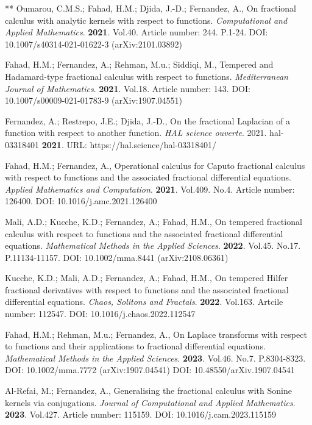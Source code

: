 \documentclass[12pt]{article}
\begin{document}
\begin{thebibliography}{**}
Oumarou, C.M.S.; Fahad, H.M.; Djida, J.-D.; Fernandez, A., 
On fractional calculus with analytic kernels with respect to functions.
\textit{Computational and Applied Mathematics}. 
\textbf{2021}. Vol.40. Article number: 244. P.1-24.
DOI: 10.1007/s40314-021-01622-3
(arXiv:2101.03892)

Fahad, H.M.; Fernandez, A.; Rehman, M.u.; Siddiqi, M.,
Tempered and Hadamard-type fractional calculus with respect to functions.
\textit{Mediterranean Journal of Mathematics}.
\textbf{2021}. Vol.18. Article number: 143.
DOI: 10.1007/s00009-021-01783-9 (arXiv:1907.04551)
 

Fernandez, A.; Restrepo, J.E.; Djida, J.-D., 
On the fractional Laplacian of a function with respect to another function.
\textit{HAL science ouverte}. 2021. hal-03318401
\textbf{2021}. URL: https://hal.science/hal-03318401/

Fahad, H.M.; Fernandez, A.,
Operational calculus for Caputo fractional calculus with respect to functions and the associated fractional differential equations.
\textit{Applied Mathematics and Computation}.
\textbf{2021}. Vol.409. No.4. Article number: 126400.
DOI: 10.1016/j.amc.2021.126400

Mali, A.D.; Kucche, K.D.; Fernandez, A.; Fahad, H.M.,
On tempered fractional calculus with respect to functions and the associated fractional differential equations.
\textit{Mathematical Methods in the Applied Sciences}.
\textbf{2022}. Vol.45. No.17. P.11134-11157.
DOI: 10.1002/mma.8441
(arXiv:2108.06361)

Kucche, K.D.; Mali, A.D.; Fernandez, A.; Fahad, H.M.,
On tempered Hilfer fractional derivatives with respect to functions and the associated fractional differential equations.
\textit{Chaos, Solitons and Fractals}.
\textbf{2022}. Vol.163. Artcile number: 112547.
DOI: 10.1016/j.chaos.2022.112547

Fahad, H.M.; Rehman, M.u.; Fernandez, A.,
On Laplace transforms with respect to functions and their applications to fractional differential equations.
\textit{Mathematical Methods in the Applied Sciences}.
\textbf{2023}. Vol.46. No.7. P.8304-8323.
DOI: 10.1002/mma.7772
(arXiv:1907.04541)	
DOI: 10.48550/arXiv.1907.04541

 Al-Refai, M.; Fernandez, A.,
Generalising the fractional calculus with Sonine kernels via conjugations.
\textit{Journal of Computational and Applied Mathematics}.
\textbf{2023}. Vol.427. Article number: 115159.
DOI: 10.1016/j.cam.2023.115159


\end{thebibliography}
\end{document}
